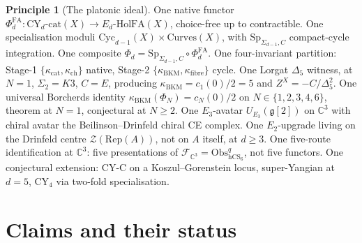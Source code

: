 \documentclass[11pt]{amsart}
\providecommand{\C}{\mathbb{C}}
\providecommand{\g}{\mathfrak{g}}
\providecommand{\cF}{\mathcal{F}}
\providecommand{\cZ}{\mathcal{Z}}
\providecommand{\Obs}{\mathrm{Obs}}
\providecommand{\HolFA}{\mathrm{HolFA}}
\providecommand{\Sp}{\mathrm{Sp}}
\providecommand{\Cyc}{\mathrm{Cyc}}
\providecommand{\Rep}{\mathrm{Rep}}
\providecommand{\hCS}{\mathrm{hCS}}
\providecommand{\Etwo}{E_2}
\providecommand{\Ethree}{E_3}
\providecommand{\Ed}{E_d}
\providecommand{\kch}{\kappa_{\mathrm{ch}}}
\providecommand{\kcat}{\kappa_{\mathrm{cat}}}
\providecommand{\kBKM}{\kappa_{\mathrm{BKM}}}
\providecommand{\kfib}{\kappa_{\mathrm{fibre}}}
\providecommand{\Phifun}{\Phi}
\providecommand{\PhiFA}{\Phi^{\mathrm{FA}}}
\theoremstyle{plain}
\theoremstyle{definition}
\newtheorem{principle}[theorem]{Principle}
\theoremstyle{remark}
\begin{document}
\begin{principle}[The platonic ideal]
\label{prin:platonic}
One native functor
$\PhiFA_d:\mathrm{CY}_d\text{-cat}(X)\to\Ed\text{-}\HolFA(X)$,
choice-free up to contractible.
One specialisation moduli
$\Cyc_{d-1}(X)\times\mathrm{Curves}(X)$,
with $\Sp_{\Sigma_{d-1},C}$ compact-cycle integration.
One composite
$\Phifun_d=\Sp_{\Sigma_{d-1},C}\circ\PhiFA_d$.
One four-invariant partition: Stage-1 $\{\kcat,\kch\}$ native,
Stage-2 $\{\kBKM,\kfib\}$ cycle.
One Lorgat $\Delta_5$ witness, at $N=1$, $\Sigma_2=K3$, $C=E$,
producing $\kBKM=c_1(0)/2=5$ and $Z^X = -C/\Delta_5^2$.
One universal Borcherds identity
$\kBKM(\Phi_N)=c_N(0)/2$ on $N\in\{1,2,3,4,6\}$, theorem at $N=1$,
conjectural at $N\geq 2$.
One $\Ethree$-avatar $U_{\Ethree}(\g[2])$ on $\C^3$ with chiral
avatar the Beilinson--Drinfeld chiral CE complex.
One $\Etwo$-upgrade living on the Drinfeld centre
$\cZ(\Rep(A))$, not on $A$ itself, at $d\geq 3$.
One five-route identification at $\C^3$: five presentations of
$\cF_{\C^3}=\Obs^{q}_{\hCS_6}$, not five functors.
One conjectural extension: CY-C on a Koszul--Gorenstein locus,
super-Yangian at $d=5$, CY$_4$ via two-fold specialisation.
\end{principle}

\section{Claims and their status}
\end{document}
